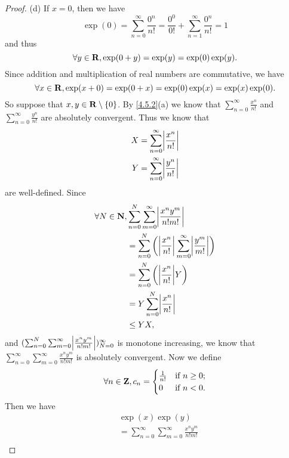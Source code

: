 \begin{proof}{(d)}
  If \(x = 0\), then we have
  \[
    \exp(0) = \sum_{n = 0}^\infty \frac{0^n}{n!} = \frac{0^0}{0!} + \sum_{n = 1}^\infty \frac{0^n}{n!} = 1
  \]
  and thus
  \[
    \forall y \in \mathbf{R}, \exp(0 + y) = \exp(y) = \exp(0) \exp(y).
  \]
  Since addition and multiplication of real numbers are commutative, we have
  \[
    \forall x \in \mathbf{R}, \exp(x + 0) = \exp(0 + x) = \exp(0) \exp(x) = \exp(x) \exp(0).
  \]
  So suppose that \(x, y \in \mathbf{R} \setminus \{0\}\).
  By \cref{4.5.2}(a) we know that \(\sum_{n = 0}^\infty \frac{x^n}{n!}\) and \(\sum_{n = 0}^\infty \frac{y^n}{n!}\) are absolutely convergent.
  Thus we know that
  \begin{align*}
    X & = \sum_{n = 0}^\infty \abs{\frac{x^n}{n!}} \\
    Y & = \sum_{n = 0}^\infty \abs{\frac{y^n}{n!}}
  \end{align*}
  are well-defined.
  Since
  \begin{align*}
    \forall N \in \N, & \sum_{n = 0}^N \sum_{m = 0}^\infty \abs{\frac{x^n y^m}{n! m!}}                             \\
                      & = \sum_{n = 0}^N \bigg(\abs{\frac{x^n}{n!}} \sum_{m = 0}^\infty \abs{\frac{y^m}{m!}}\bigg) \\
                      & = \sum_{n = 0}^N \bigg(\abs{\frac{x^n}{n!}} Y\bigg)                                        \\
                      & = Y \sum_{n = 0}^N \abs{\frac{x^n}{n!}}                                                    \\
                      & \leq Y X,
  \end{align*}
  and \((\sum_{n = 0}^N \sum_{m = 0}^\infty \abs{\frac{x^n y^m}{n! m!}})_{N = 0}^\infty\) is monotone increasing, we know that \(\sum_{n = 0}^\infty \sum_{m = 0}^\infty \frac{x^n y^m}{n! m!}\) is absolutely convergent.
  Now we define
  \[
    \forall n \in \mathbf{Z}, c_n = \begin{cases}
      \frac{1}{n!} & \text{if } n \geq 0; \\
      0            & \text{if } n < 0.
    \end{cases}
  \]
  Then we have
  \begin{align*}
     & \exp(x) \exp(y)                                                                                                                          \\
     & = \sum_{n = 0}^\infty \sum_{m = 0}^\infty \frac{x^n y^m}{n! m!}                                                                          \\

\end{align*}
\end{proof}
